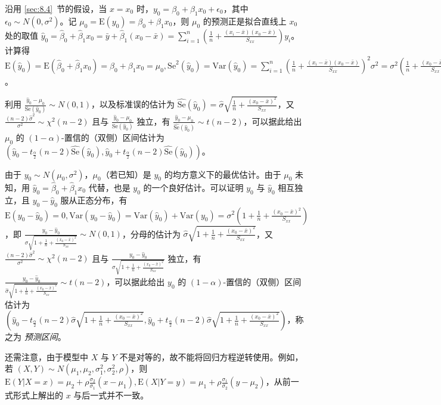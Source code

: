 \documentclass[../main.tex]{subfiles}
\begin{document}
沿用 \ref{sec:8.4}~节的假设，当 $x=x_0$ 时，$y_0=\beta_0+\beta_1x_0+\epsilon_0$，其中 $\epsilon_0\sim N(0,\sigma^2)$。记 $\mu_0=\mathrm E(y_0)=\beta_0+\beta_1x_0$，则 $\mu_0$ 的预测正是拟合直线上 $x_0$ 处的取值 $\hat y_0=\hat\beta_0+\hat\beta_1x_0=\bar y+\hat\beta_1(x_0-\bar x)=\sum_{i=1}^n(\frac1n+\frac{(x_i-\bar x)(x_0-\bar x)}{S_{xx}})y_i$。计算得 $\mathrm E(\hat y_0)=\mathrm E(\hat\beta_0+\hat\beta_1x_0)=\beta_0+\beta_1x_0=\mu_0,\mathrm{Se}^2(\hat y_0)=\mathrm{Var}(\hat y_0)=\sum_{i=1}^n(\frac1n+\frac{(x_i-\bar x)(x_0-\bar x)}{S_{xx}})^2\sigma^2=\sigma^2(\frac1n+\frac{(x_0-\bar x)^2}{S_{xx}})$。

利用 $\frac{\hat y_0-\mu_0}{\mathrm{Se}(\hat y_0)}\sim N(0,1)$，以及标准误的估计为 $\widehat{\mathrm{Se}}(\hat y_0)=\hat\sigma\sqrt{\frac1n+\frac{(x_0-\bar x)^2}{S_{xx}}}$，又 $\frac{(n-2)\hat\sigma^2}{\sigma^2}\sim\chi^2(n-2)$ 且与 $\frac{\hat y_0-\mu_0}{\mathrm{Se}(\hat y_0)}$ 独立，有 $\frac{\hat y_0-\mu_0}{\widehat{\mathrm{Se}}(\hat y_0)}\sim t(n-2)$，可以据此给出 $\mu_0$ 的 $(1-\alpha)$-置信的（双侧）区间估计为 $(\hat y_0-t_{\frac\alpha2}(n-2)\widehat{\mathrm{Se}}(\hat y_0),\hat y_0+t_{\frac\alpha2}(n-2)\widehat{\mathrm{Se}}(\hat y_0))$。

由于 $y_0\sim N(\mu_0,\sigma^2)$，$\mu_0$（若已知）是 $y_0$ 的均方意义下的最优估计。由于 $\mu_0$ 未知，用 $\hat y_0=\hat\beta_0+\hat\beta_1x_0$ 代替，也是 $y_0$ 的一个良好估计。可以证明 $y_0$ 与 $\hat y_0$ 相互独立，且 $y_0-\hat y_0$ 服从正态分布，有 $\mathrm E(y_0-\hat y_0)=0,\mathrm{Var}(y_0-\hat y_0)=\mathrm{Var}(\hat y_0)+\mathrm{Var}(y_0)=\sigma^2(1+\frac1n+\frac{(x_0-\bar x)^2}{S_{xx}})$，即 $\frac{y_0-\hat y_0}{\sigma\sqrt{1+\frac1n+\frac{(x_0-\bar x)^2}{S_{xx}}}}\sim N(0,1)$，分母的估计为 $\hat\sigma\sqrt{1+\frac1n+\frac{(x_0-\bar x)^2}{S_{xx}}}$，又 $\frac{(n-2)\hat\sigma^2}{\sigma^2}\sim\chi^2(n-2)$ 且与 $\frac{y_0-\hat y_0}{\sigma\sqrt{1+\frac1n+\frac{(x_0-\bar x)^2}{S_{xx}}}}$ 独立，有 $\frac{y_0-\hat y_0}{\hat\sigma\sqrt{1+\frac1n+\frac{(x_0-\bar x)^2}{S_{xx}}}}\sim t(n-2)$，可以据此给出 $y_0$ 的 $(1-\alpha)$-置信的（双侧）区间估计为 $(\hat y_0-t_{\frac\alpha2}(n-2)\hat\sigma\sqrt{1+\frac1n+\frac{(x_0-\bar x)^2}{S_{xx}}},\hat y_0+t_{\frac\alpha2}(n-2)\hat\sigma\sqrt{1+\frac1n+\frac{(x_0-\bar x)^2}{S_{xx}}})$，称之为 \emph{预测区间}。



还需注意，由于模型中 $X$ 与 $Y$ 不是对等的，故不能将回归方程逆转使用。例如，若 $(X,Y)\sim N(\mu_1,\mu_2,\sigma_1^2,\sigma_2^2,\rho)$，则 $\mathrm E(Y|X=x)=\mu_2+\rho\frac{\sigma_2}{\sigma_1}(x-\mu_1),\mathrm E(X|Y=y)=\mu_1+\rho\frac{\sigma_1}{\sigma_2}(y-\mu_2)$，从前一式形式上解出的 $x$ 与后一式并不一致。

\end{document}

